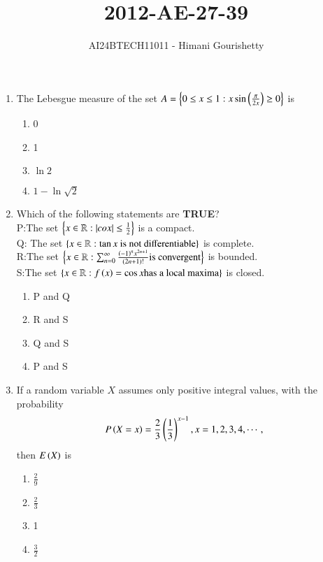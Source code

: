 \documentclass[journal,12pt,onecolumn]{IEEEtran}
\theoremstyle{remark}
\begin{document}

\vspace{3cm}

\title{2012-AE-27-39}
\author{AI24BTECH11011 - Himani Gourishetty}
\maketitle
\bigskip

\renewcommand{\thefigure}{\theenumi}
\renewcommand{\thetable}{\theenumi}
\begin{enumerate}
	\item The Lebesgue measure of the set $A=\left\{0\leq x\leq 1:x\sin\left(\frac{\pi}{2x}\right)\geq 0\right\}$ is
    \begin{enumerate}
        \item 0
        \item 1
        \item $\ln 2$
        \item $1-\ln\sqrt{2}$
    \end{enumerate}
    \item Which of the following statements are \textbf{TRUE}?\\
    P:The set $\left\{x \in \mathbb{R}:\left\vert cox\right\vert\leq \frac{1}{2}\right\}$ is a compact.\\
    Q: The set $\left\{x \in \mathbb{R}:\tan x \text{ is not differentiable}\right\}$ is complete.\\
    R:The set $\left\{x \in \mathbb{R}:\sum_{n=0}^{\infty}\frac{\left(-1\right)^nx^{2n+1}}{\left(2n+1\right)!}\text{is convergent}\right\} $ is bounded.\\
    S:The set $\left\{x \in \mathbb{R}:f\left(x\right)=\cos x \text{has a local maxima}\right\}$ is closed.
    \begin{enumerate}
        \item P and Q
        \item R and S
        \item Q and S
        \item P and S
    \end{enumerate}
    \item If a random variable $X$ assumes only positive integral values, with the probability $$P\left(X=x\right)=\frac{2}{3}\left(\frac{1}{3}\right)^{x-1},x=1,2,3,4,\cdots,$$ then $E\left(X\right)$ is
    \begin{enumerate}
        \item $\frac{2}{9}$
        \item $\frac{2}{3}$
        \item 1
        \item $\frac{3}{2}$

\end{enumerate}
\end{enumerate}
\end{document}
